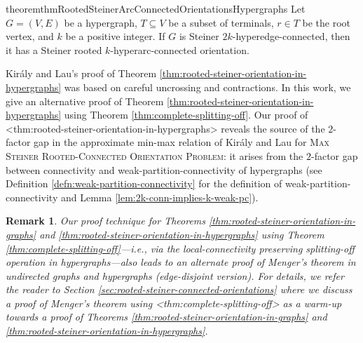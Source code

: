 \documentclass{article}
\def\Cref#1{<#1>}%
\newtheorem{remark}{Remark}[section]
\newcommand{\knote}[1]{{\color{red}[{\tiny Karthik: \bf #1}]\marginpar{\color{red}*}}}
\begin{document}
\begin{restatable}{theorem}{thmRootedSteinerArcConnectedOrientationsHypergraphs}\label{thm:rooted-steiner-orientation-in-hypergraphs}
Let $G=(V, E)$ be a hypergraph, $T\subseteq V$ be a subset of terminals, $r\in T$ be the root vertex, and $k$ be a positive integer. If $G$ is Steiner $2k$-hyperedge-connected, then it has a Steiner rooted $k$-hyperarc-connected orientation. 
\end{restatable}
Kir\'{a}ly and Lau's proof of Theorem \ref{thm:rooted-steiner-orientation-in-hypergraphs} was based on careful uncrossing and contractions. In this work, we give an alternative proof of Theorem \ref{thm:rooted-steiner-orientation-in-hypergraphs} using Theorem \ref{thm:complete-splitting-off}. 
Our proof of \Cref{thm:rooted-steiner-orientation-in-hypergraphs} reveals the source of the $2$-factor gap in the approximate min-max relation of Kir\'{a}ly and Lau for \textsc{Max Steiner Rooted-Connected Orientation Problem}: it arises from the $2$-factor gap between connectivity and weak-partition-connectivity of hypergraphs (see Definition \ref{defn:weak-partition-connectivity} for the definition of weak-partition-connectivity and Lemma \ref{lem:2k-conn-implies-k-weak-pc}). 

\begin{remark}
Our proof technique for Theorems \ref{thm:rooted-steiner-orientation-in-graphs} and \ref{thm:rooted-steiner-orientation-in-hypergraphs} using Theorem \ref{thm:complete-splitting-off}---i.e., via the local-connectivity preserving splitting-off operation in hypergraphs---also leads to an alternate proof of Menger's theorem in \emph{undirected} graphs and hypergraphs (edge-disjoint version). For details, we refer the reader to Section \ref{sec:rooted-steiner-connected-orientations} where we discuss a proof of Menger's theorem using \Cref{thm:complete-splitting-off} as a warm-up towards a proof of Theorems \ref{thm:rooted-steiner-orientation-in-graphs} and \ref{thm:rooted-steiner-orientation-in-hypergraphs}. 
\end{remark}
\end{document}

